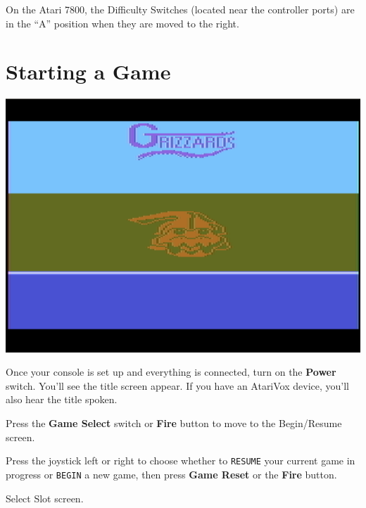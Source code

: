 \documentclass[10pt,twocolumn,openany,article]{memoir}
\begin{document}
On the Atari 7800, the  Difficulty Switches (located near the controller
ports) are in the ``A'' position when they are moved to the right.

\ifdefined\ATARIAGESAVE\vfill\pagebreak\fi

\section{Starting a Game}

\begin{center}
  \includegraphics[width=\columnwidth]{../Manual/TitleAquaxNTSC.png}
\end{center}

Once your  console is set  up and everything  is connected, turn  on the
\textbf{Power} switch. You'll  see the title screen appear.  If you have
an AtariVox device, you'll also hear the title spoken.

Press the \textbf{Game Select} switch or \textbf{Fire} button to move to
the
\ifdefined\NOSAVE
Begin/Resume screen.

Press the  joystick left or  right to choose whether  to \texttt{RESUME}
your current game  in progress or \texttt{BEGIN} a new  game, then press
\textbf{Game Reset} or the \textbf{Fire} button.

\else
Select Slot screen.
\end{document}
